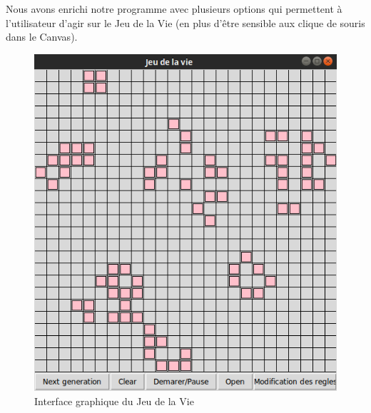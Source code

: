 \documentclass{article}
\begin{document}
Nous avons enrichi notre programme avec plusieurs options qui permettent à l'utilisateur d'agir sur le Jeu de la Vie (en plus d’être sensible aux clique de souris dans le Canvas).\\

\begin{figure}[H]
	\begin{center}
			\includegraphics[scale=0.50]{capture_game.png}
         \end{center}
        \caption{Interface graphique du Jeu de la Vie}
	\label{desc}
\end{figure}
\end{document}

